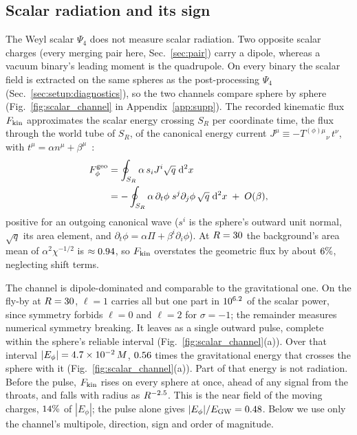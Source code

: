 \documentclass[twocolumn,floatfix,aps,prd,superscriptaddress,nofootinbib]{revtex4-2}
\begin{document}
\subsection{Scalar radiation and its sign}
\label{sec:gw:scalar}

The Weyl scalar $\Psi_4$ does not measure scalar radiation. Two opposite scalar charges (every merging pair here, Sec.~\ref{sec:pair}) carry a dipole, whereas a vacuum binary's leading moment is the quadrupole. On every binary the scalar field is extracted on the same spheres as the post-processing $\Psi_4$ (Sec.~\ref{sec:setup:diagnostics}), so the two channels compare sphere by sphere (Fig.~\ref{fig:scalar_channel} in Appendix~\ref{app:supp}). The recorded kinematic flux $F_{\rm kin}$ approximates the scalar energy crossing $S_R$ per coordinate time, the flux through the world tube of $S_R$, of the canonical energy current $J^\mu\equiv-T^{(\phi)\mu}{}_{\nu}\,t^\nu$, with $t^\mu=\alpha n^\mu+\beta^\mu$~\cite{clough2021,gourgoulhon2012}:
\begin{equation}
\begin{split}
F^{\rm geo}_\phi&=\oint_{S_R}\alpha\,s_iJ^i\sqrt{q}\;\mathrm{d}^2x\\
&=-\oint_{S_R}\alpha\,\partial_t\phi\;s^j\partial_j\phi\,\sqrt{q}\;\mathrm{d}^2x\;+\;O(\beta),
\end{split}
\label{eq:scalarflux}
\end{equation}
positive for an outgoing canonical wave ($s^i$ is the sphere's outward unit normal, $\sqrt{q}$ its area element, and $\partial_t\phi=\alpha\Pi+\beta^i\partial_i\phi$). At $R=30$ the background's area mean of $\alpha^2\chi^{-1/2}$ is $\approx0.94$, so $F_{\rm kin}$ overstates the geometric flux by about $6\%$, neglecting shift terms.

The channel is dipole-dominated and comparable to the gravitational one. On the fly-by at $R=30$, $\ell=1$ carries all but one part in $10^{6.2}$ of the scalar power, since symmetry forbids $\ell=0$ and $\ell=2$ for $\sigma=-1$; the remainder measures numerical symmetry breaking. It leaves as a single outward pulse, complete within the sphere's reliable interval (Fig.~\ref{fig:scalar_channel}(a)). Over that interval $|E_\phi|=4.7\times10^{-2}\,M$, $0.56$ times the gravitational energy that crosses the sphere with it (Fig.~\ref{fig:scalar_channel}(a)). Part of that energy is not radiation. Before the pulse, $F_{\rm kin}$ rises on every sphere at once, ahead of any signal from the throats, and falls with radius as $R^{-2.5}$. This is the near field of the moving charges, $14\%$ of $|E_\phi|$; the pulse alone gives $|E_\phi|/E_{\rm GW}=0.48$. Below we use only the channel's multipole, direction, sign and order of magnitude.
\end{document}
